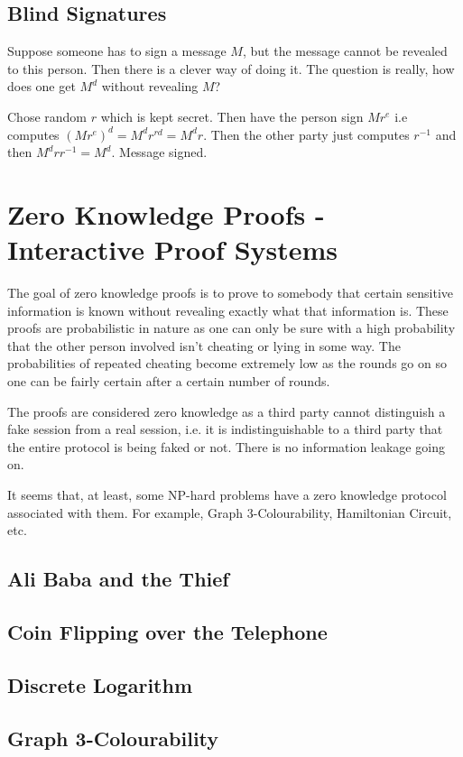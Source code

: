\documentclass[12pt,a4paper]{article}
\begin{document}
\subsection{Blind Signatures}
Suppose someone has to sign a message $M$, but the message cannot be revealed to this person. Then there is a clever way of doing it. The question is really, how does one get $M^{d}$ without revealing $M$? 

Chose random $r$ which is kept secret. Then have the person sign $Mr^{e}$ i.e computes $(Mr^{e})^{d} = M^{d}r^{rd} = M^{d}r$. Then the other party just computes $r^{-1}$ and then $M^{d}rr^{-1} = M^{d}$. Message signed. 


\section{Zero Knowledge Proofs - Interactive Proof Systems}
The goal of zero knowledge proofs is to prove to somebody that certain sensitive information is known without revealing exactly what that information is. These proofs are probabilistic in nature as one can only be sure with a high probability that the other person involved isn't cheating or lying in some way. The probabilities of repeated cheating become extremely low as the rounds go on so one can be fairly certain after a certain number of rounds. 

The proofs are considered zero knowledge as a third party cannot distinguish a fake session from a real session, i.e. it is indistinguishable to a third party that the entire protocol is being faked or not. There is no information leakage going on. 

It seems that, at least, some NP-hard problems have a zero knowledge protocol associated with them. For example, Graph 3-Colourability, Hamiltonian Circuit, etc. 

\subsection{Ali Baba and the Thief}
\subsection{Coin Flipping over the Telephone}
\subsection{Discrete Logarithm}
\subsection{Graph 3-Colourability}
\end{document}
